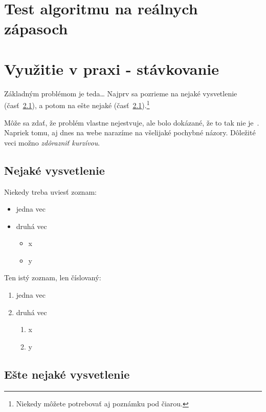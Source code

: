 \documentclass[10pt,twoside,slovak,a4paper]{article}
\begin{document}
\section{Test algoritmu na reálnych zápasoch}

\section{Využitie v praxi - stávkovanie}

Základným problémom je teda\ldots{} Najprv sa pozrieme na nejaké vysvetlenie (časť~\ref{ina:nejake}), a potom na ešte nejaké (časť~\ref{ina:nejake}).\footnote{Niekedy môžete potrebovať aj poznámku pod čiarou.}

Môže sa zdať, že problém vlastne nejestvuje\cite{Coplien:MPD}, ale bolo dokázané, že to tak nie je~\cite{Czarnecki:Staged, Czarnecki:Progress}. Napriek tomu, aj dnes na webe narazíme na všelijaké pochybné názory\cite{PLP-Framework}. Dôležité veci možno \emph{zdôrazniť kurzívou}.


\subsection{Nejaké vysvetlenie} \label{ina:nejake}

Niekedy treba uviesť zoznam:

\begin{itemize}
\item jedna vec
\item druhá vec
	\begin{itemize}
	\item x
	\item y
	\end{itemize}
\end{itemize}

Ten istý zoznam, len číslovaný:

\begin{enumerate}
\item jedna vec
\item druhá vec
	\begin{enumerate}
	\item x
	\item y
	\end{enumerate}
\end{enumerate}


\subsection{Ešte nejaké vysvetlenie} \label{ina:este}
\end{document}

